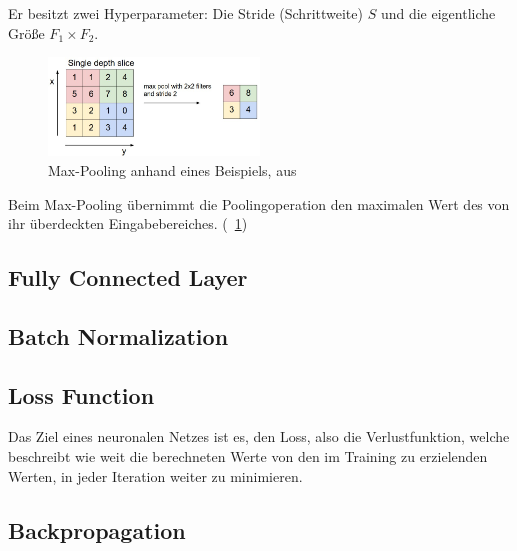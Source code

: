 Er besitzt zwei Hyperparameter: Die Stride (Schrittweite) $S$ und die eigentliche Größe $F_1\times F_2$. \cite{cs231n}

\begin{figure}[H]
	\centering
	\includegraphics[width=0.5\textwidth,keepaspectratio]{images/cs231n/maxpool.jpg}
	\captionsetup{format=plain}
	\caption{Max-Pooling anhand eines Beispiels, aus \cite{cs231n}}
	\label{fig:maxpooling}
\end{figure}

Beim Max-Pooling übernimmt die Poolingoperation den maximalen Wert des von ihr überdeckten Eingabebereiches. (\vgl \figurename~\ref{fig:maxpooling})

\subsection{Fully Connected Layer}
\label{ssec:fcn}

\subsection{Batch Normalization}
\label{ssec:bn}

\subsection{Loss Function}
\label{ssec:loss}

Das Ziel eines neuronalen Netzes ist es, den Loss, also die Verlustfunktion, welche beschreibt wie weit die berechneten Werte von den im Training zu erzielenden Werten, in jeder Iteration weiter zu minimieren.

\subsection{Backpropagation}
\label{ssec:backpropagation}